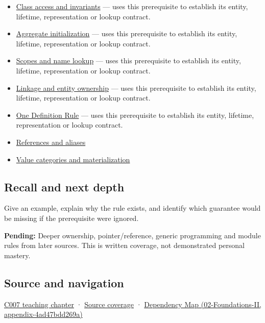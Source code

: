 \begin{itemize}
\tightlist
\item
  \hyperref[appendix-8e5214819615]{Class access and invariants} --- uses this prerequisite to establish its entity, lifetime, representation or lookup contract.
\item
  \hyperref[appendix-b7174c179542]{Aggregate initialization} --- uses this prerequisite to establish its entity, lifetime, representation or lookup contract.
\item
  \hyperref[appendix-b12b31759da1]{Scopes and name lookup} --- uses this prerequisite to establish its entity, lifetime, representation or lookup contract.
\item
  \hyperref[appendix-74a0ec818c18]{Linkage and entity ownership} --- uses this prerequisite to establish its entity, lifetime, representation or lookup contract.
\item
  \hyperref[appendix-49d27bc9d9a5]{One Definition Rule} --- uses this prerequisite to establish its entity, lifetime, representation or lookup contract.
\item
  \hyperref[appendix-d6d562ca9fbb]{References and aliases}
\item
  \hyperref[appendix-1121b30eaeb0]{Value categories and materialization}
\end{itemize}

\subsection{Recall and next depth}\label{recall-and-next-depth}

Give an example, explain why the rule exists, and identify which guarantee would be missing if the prerequisite were ignored.

\textbf{Pending:} Deeper ownership, pointer/reference, generic programming and module rules from later sources. This is written coverage, not demonstrated personal mastery.

\subsection{Source and navigation}\label{source-and-navigation}

\href{Continuous\%20Notes/Computing\%20Foundations\%20-\%20From\%20Bits\%20to\%20C++\%20and\%20Systems\%20APIs\#Promises\%20become\%20definitions}{C007 teaching chapter} · \hyperref[appendix-fd090d982a15]{Source coverage} · \href{}{Dependency Map (02-Foundations-II, appendix-4ad47bdd269a)}
